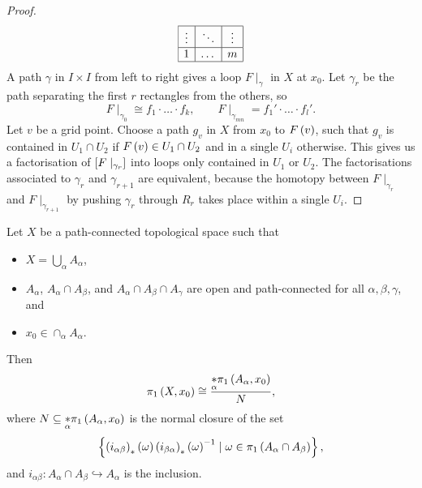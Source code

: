 \begin{proof}
$$\begin{array}{|c|c|c|}
\hline
\vdots & \ddots & \vdots \\
\hline
1 & \dots & m \\
\hline
\end{array}
$$
A path $ \gamma $ in $ I \times I $ from left to right gives a loop $ F \mid_\gamma $ in $ X $ at $ x_0 $. Let $ \gamma_r $ be the path separating the first $ r $ rectangles from the others, so
$$ F \mid_{\gamma_0} \cong f_1 \cdot \dots \cdot f_k, \qquad F \mid_{\gamma_{mn}} = f_1' \cdot \dots \cdot f_l'. $$
Let $ v $ be a grid point. Choose a path $ g_v $ in $ X $ from $ x_0 $ to $ F\rb{v} $, such that $ g_v $ is contained in $ U_1 \cap U_2 $ if $ F\rb{v} \in U_1 \cap U_2 $ and in a single $ U_i $ otherwise. This gives us a factorisation of $ \sb{F \mid_{\gamma_r}} $ into loops only contained in $ U_1 $ or $ U_2 $. The factorisations associated to $ \gamma_r $ and $ \gamma_{r + 1} $ are equivalent, because the homotopy between $ F \mid_{\gamma_r} $ and $ F \mid_{\gamma_{r + 1}} $ by pushing $ \gamma_r $ through $ R_r $ takes place within a single $ U_i $.
\end{proof}


\begin{theorem}
Let $ X $ be a path-connected topological space such that
\begin{itemize}
\item $ X = \bigcup_\alpha A_\alpha $,
\item $ A_\alpha $, $ A_\alpha \cap A_\beta $, and $ A_\alpha \cap A_\beta \cap A_\gamma $ are open and path-connected for all $ \alpha, \beta, \gamma $, and
\item $ x_0 \in \cap_\alpha A_\alpha $.
\end{itemize}
Then
$$ \pi_1\rb{X, x_0} \cong \dfrac{\underset{\alpha}{*} \pi_1\rb{A_\alpha, x_0}}{N}, $$
where $ N \subseteq \underset{\alpha}{*} \pi_1\rb{A_\alpha, x_0} $ is the normal closure of the set
$$ \cb{\rb{i_{\alpha\beta}}_*\rb{\omega}\rb{i_{\beta\alpha}}_*\rb{\omega}^{-1} \mid \omega \in \pi_1\rb{A_\alpha \cap A_\beta}}, $$
and $ i_{\alpha\beta} : A_\alpha \cap A_\beta \hookrightarrow A_\alpha $ is the inclusion.
\end{theorem}

